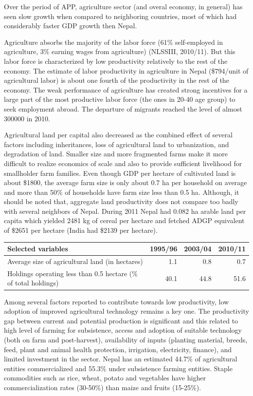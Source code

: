 \documentclass[
  openany]{book}
\begin{document}
Over the period of APP, agriculture sector (and overal economy, in general) has seen slow growth when compared to neighboring countries, most of which had considerably faster GDP growth then Nepal.

Agriculture absorbs the majority of the labor force (61\% self-employed in agriculture, 3\% earning wages from agriculture) (NLSSIII, 2010/11). But this labor force is characterized by low productivity relatively to the rest of the economy. The estimate of labor productivity in agriculture in Nepal (\$794/unit of agricultural labor) is about one fourth of the productivity in the rest of the economy. The weak performance of agriculture has created strong incentives for a large part of the most productive labor force (the ones in 20-40 age group) to seek employment abroad. The departure of migrants reached the level of almost 300000 in 2010.

Agricultural land per capital also decreased as the combined effect of several factors including inheritances, loss of agricultural land to urbanization, and degradation of land. Smaller size and more fragmented farms make it more difficult to realize economics of scale and also to provide sufficient livelihood for smallholder farm families. Even though GDP per hectare of cultivated land is about \$1800, the average farm size is only about 0.7 ha per household on average and more than 50\% of households have farm size less than 0.5 ha. Although, it should be noted that, aggregate land productivity does not compare too badly with several neighbors of Nepal. During 2011 Nepal had 0.082 ha arable land per capita which yielded 2481 kg of cereal per hectare and fetched ADGP equivalent of \$2651 per hectare (India had \$2139 per hectare).

\begin{tabular}{lrrr}
\toprule
Selected variables & 1995/96 & 2003/04 & 2010/11\\
\midrule
Average size of agricultural land (in hectares) & 1.1 & 0.8 & 0.7\\
Holdings operating less than 0.5 hectare (\% of total holdings) & 40.1 & 44.8 & 51.6\\
\bottomrule
\end{tabular}

Among several factors reported to contribute towards low productivity, low adoption of improved agricultural technology remains a key one. The productivity gap between current and potential production is significant and this related to high level of farming for subsistence, access and adoption of suitable technology (both on farm and post-harvest), availability of inputs (planting material, breeds, feed, plant and animal health protection, irrigation, electricity, finance), and limited investment in the sector. Nepal has an estimated 44.7\% of agricultural entities commercialized and 55.3\% under subsistence farming entities. Staple commodities such as rice, wheat, potato and vegetables have higher commercialization rates (30-50\%) than maize and fruits (15-25\%).
\end{document}
